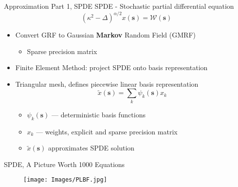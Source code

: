 \documentclass{beamer}
\begin{document}
\begin{frame}{Approximation Part 1, SPDE}
SPDE - Stochastic partial differential equation \citep{Lindgren2011}
$$ (\kappa^{2} - \Delta)^{\alpha/2}x(\pmb{s}) = \mathcal{W}(\pmb{s})$$
\begin{itemize}
\addtolength{\itemsep}{0.5\baselineskip}
\item Convert GRF to Gaussian {\bf Markov} Random Field (GMRF)
    \begin{itemize}
    \item Sparse precision matrix
    \end{itemize}
\item Finite Element Method: project SPDE onto basis representation    
\item Triangular mesh, defines piecewise linear basis representation
$$ \tilde{x}(\pmb{s}) = \sum_{k} \psi_{k}(\pmb{s})x_{k}$$
                  \begin{itemize}
                  \addtolength{\itemsep}{0.5\baselineskip}
                  \item $\psi_{k}(\pmb{s})$ --- deterministic basis functions
                  \item $x_{k}$ --- weights, explicit and sparse precision matrix
                  \item $\tilde{x}(\pmb{s})$ approximates SPDE solution
                  \end{itemize}
\end{itemize}
\end{frame}

\begin{frame}{SPDE, A Picture Worth 1000 Equations}

  \begin{figure}[H]
	\centering
	\texttt{[image: Images/PLBF.jpg]}
	\end{figure}
	\citep{Simpson2012}
\end{frame}
\end{document}
